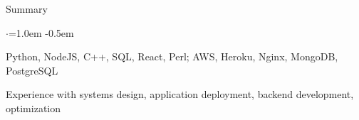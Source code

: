 \documentclass{resume} %
\begin{document}

\begin{rSection}{Summary}
  \vspace{0.5em}
  \begin{list}{$\cdot$}{\leftmargin=1.0em}
    \itemsep -0.5em \vspace{-0.5em}
    \item Python, NodeJS, C++, SQL, React, Perl; AWS, Heroku, Nginx, MongoDB, PostgreSQL
	\item Experience with systems design, application deployment, backend development, optimization
  \end{list}
  \vspace{0.25em}
\end{rSection}

\end{document}
